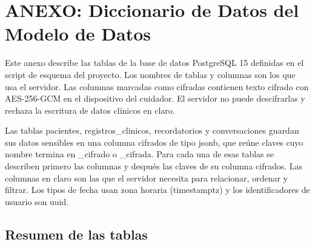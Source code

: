 \chapter[Anexo: Diccionario de Datos]{ANEXO: Diccionario de Datos del Modelo de Datos}

Este anexo describe las tablas de la base de datos PostgreSQL 15 definidas en el
script de esquema del proyecto. Los nombres de tablas y columnas son los que
usa el servidor. Las columnas marcadas como cifradas contienen texto cifrado con
AES-256-GCM en el dispositivo del cuidador. El servidor no puede descifrarlas y
rechaza la escritura de datos clínicos en claro.

Las tablas pacientes, registros\_clinicos, recordatorios y
conversaciones guardan sus datos sensibles en una columna cifrados de
tipo jsonb, que reúne claves cuyo nombre termina en \_cifrado
o \_cifrada. Para cada una de esas tablas se describen primero las columnas y
después las claves de su columna cifrados. Las columnas en claro son las que
el servidor necesita para relacionar, ordenar y filtrar. Los tipos de fecha
usan zona horaria (timestamptz) y los identificadores de usuario son uuid.

\section{Resumen de las tablas}

